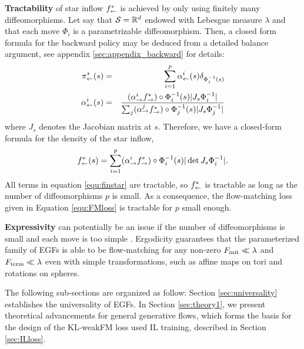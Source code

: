 \documentclass{article}
\theoremstyle{plain}
\theoremstyle{definition}
\theoremstyle{remark}
\theoremstyle{fact}
\begin{document}
     \textbf{Tractability} of  star inflow $f^*_{\leftarrow}$ is achieved by only using finitely many diffeomorphisms. Let say that $\mathcal S=\mathbb R^d$ endowed with Lebesgue measure $\lambda$ and that each move $\Phi_i$ is a parametrizable diffeomorphism. Then, a closed form formula for the backward policy may be deduced from a detailed balance argument, see appendix \ref{sec:appendix_backward} for details:
    \begin{eqnarray}\label{equ:tractable_inflow}
\pi_{\leftarrow}^*(s) &=& \sum_{i=1}^p\alpha_{\leftarrow}^i(s) \delta_{\Phi_i^{-1}(s)} \\ 
\alpha_{\leftarrow}^i(s) &=& \frac{(\alpha_{\rightarrow}^if^*_\rightarrow)\circ \Phi_i^{-1}(s)|J_s {\Phi_i^{-1}}| }{ \sum_j (\alpha_{\rightarrow}^jf^*_\rightarrow)\circ \Phi_j^{-1}(s) |J_s {\Phi_j^{-1}}|}
\end{eqnarray}
where $J_s$ denotes the Jacobian matrix at $s$.
Therefore, we have a closed-form formula for the density of the star inflow,
\begin{equation} \label{equ:finstar}
    f^*_{\leftarrow}(s)  = \sum_{i=1}^p  (\alpha_{\rightarrow}^if^*_{\rightarrow})\circ \Phi_i^{-1}(s) |\det J_s \Phi_i^{-1}|.
\end{equation}
All terms in equation \eqref{equ:finstar} are tractable, so  $f^*_{\leftarrow}$ is tractable as long as the number of diffeomorphisms $p$ is small. 
As a consequence, the flow-matching loss given in Equation \eqref{equ:FMloss} is tractable for $p$ small enough.

\textbf{Expressivity} can potentially be an issue if the number of diffeomorphisms is small and each move is too simple \cite{rezende2020normalizing}. Ergodicity guarantees that the parameterized family of EGFs is able to be flow-matching for any non-zero $F_{\mathrm{init}}\ll \lambda$ and  $F_{\mathrm{term}}\ll \lambda$ even with simple transformations, such as affine maps on tori and rotations on spheres. 


The following sub-sections are organized as follow: Section \ref{sec:universality} establishes the universality of EGFs. In Section \ref{sec:theory1}, we present theoretical advancements for general generative flows, which forms the basis for the design of the KL-weakFM loss used IL training, described in Section \ref{sec:ILloss}.
\end{document}
